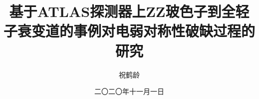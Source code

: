 \documentclass[doctor,english,pdf]{ustcthesis}
\title{基于ATLAS探测器上ZZ玻色子到全轻子衰变道的事例对电弱对称性破缺过程的研究}
\author{祝鹤龄}
\date{二〇二〇年十一月一日} %
\begin{document}
\maketitle
\makestatement

\frontmatter
\linenumbers


\tableofcontents
\listoffigures
\listoftables

\newpage

\mainmatter









\appendix
%

\backmatter

\end{document}
